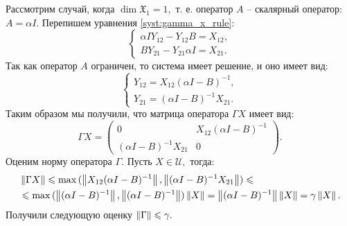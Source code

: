 Рассмотрим случай, когда $\dim\mathfrak{X}_1 = 1,$ т.\! е. оператор $A$ -- скалярный оператор: $A = \alpha I.$ Перепишем уравнения \ref{syst:gamma_x_rule}:
$$
	\begin{cases}
		\alpha IY_{12} - Y_{12}B = X_{12}, \\
		BY_{21} - Y_{21}\alpha I = X_{21}.
	\end{cases}
$$
Так как оператор $A$ ограничен, то система имеет решение, и оно имеет вид:
$$
	\begin{cases}
		Y_{12} = X_{12}(\alpha I - B)^{-1}, \\
		Y_{21} = (\alpha I - B)^{-1}X_{21}.
	\end{cases}
$$
Таким образом мы получили, что матрица оператора $\Gamma X$ имеет вид:
$$
	\Gamma X = \begin{pmatrix}
		0 & X_{12}(\alpha I - B)^{-1} \\
		(\alpha I - B)^{-1}X_{21} & 0
	\end{pmatrix}.
$$
Оценим норму оператора $\Gamma.$ Пусть $X \in \mathcal{U},$ тогда:
\begin{align*}
&\left\|\Gamma X\right\| \leqslant \max{(\left\|X_{12}(\alpha I - B)^{-1}\right\|, \left\|(\alpha I - B)^{-1}X_{21}\right\|)} \leqslant \\ 
&\leqslant \max{(\left\|(\alpha I - B)^{-1}\right\|, \left\|(\alpha I - B)^{-1}\right\|)}\left\|X\right\| = \left\|(\alpha I - B)^{-1}\right\|\left\|X\right\| = \gamma \left\|X\right\|.
\end{align*}  
Получили следующую оценку $\left\|\Gamma\right\| \leqslant \gamma.$